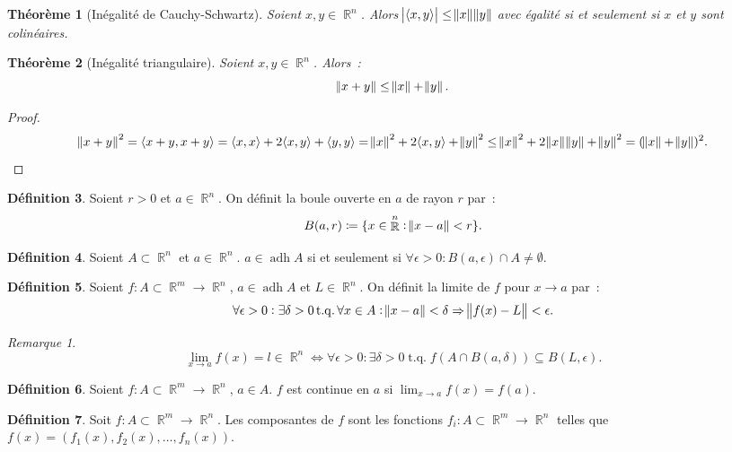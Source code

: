 \documentclass{article}
\DeclareMathOperator{\R}{\mathbb R}
\DeclareMathOperator{\adh}{adh}
\DeclareMathOperator{\tq}{ t.q. }
\newcommand{\scpr}[2]{{\left\langle#1, #2\right\rangle}}
\newtheorem{thm}{Théorème}[section]
\theoremstyle{definition}
\newtheorem{déf}[thm]{Définition}
\theoremstyle{remark}
\newtheorem*{rmq}{Remarque}
\begin{document}
		\begin{thm}[Inégalité de Cauchy-Schwartz] Soient $x, y \in \R^n$. Alors $\abs {\scpr xy} \leq \norm x\norm y$ avec égalité si et seulement si $x$ et
		$y$ sont colinéaires. \end{thm}

		\begin{thm}[Inégalité triangulaire] Soient $x, y \in \R^n$. Alors~:
		\[\norm {x+y} \leq \norm x + \norm y.\]
		\end{thm}

		\begin{proof}
		\[\norm {x+y}^2 = \scpr {x+y}{x+y} = \scpr xx + 2\scpr xy + \scpr yy = \norm x^2 + 2\scpr xy + \norm y^2 \leq \norm x^2 + 2\norm x\norm y + \norm y^2 =
		(\norm x + \norm y)^2.\]
		\end{proof}

		\begin{déf}\label{bouleOuverte} Soient $r > 0$ et $a \in \R^n$. On définit la boule ouverte en $a$ de rayon $r$ par~:
		\[B(a, r) \coloneqq \{x \in \R^n : \norm {x-a} < r\}.\]
		\end{déf}

		\begin{déf} Soient $A \subset \R^n$ et $a \in \R^n$. $a \in \adh A$ si et seulement si $\forall \epsilon > 0 : B(a, \epsilon) \cap A \neq \emptyset$.
		\end{déf}

		\begin{déf} Soient $f : A \subset \R^m \to \R^n$, $a \in \adh A$ et $L \in \R^n$. On définit la limite de $f$ pour $x \to a$ par~:
		\[\forall \epsilon > 0 : \exists \delta > 0 \tq \forall x \in A : \norm {x-a} < \delta \Rightarrow \norm {f(x)-L} < \epsilon.\]
		\end{déf}

		\begin{rmq} \[\lim_{x \to a}f(x) = l \in \R^n \iff \forall \epsilon > 0 : \exists \delta > 0 \tq f(A \cap B(a, \delta)) \subseteq B(L, \epsilon).\]
		\end{rmq}

		\begin{déf} Soient $f : A \subset \R^m \to \R^n$, $a \in A$. $f$ est continue en $a$ si $\lim_{x \to a}f(x) = f(a)$. \end{déf}

		\begin{déf} Soit $f : A \subset \R^m \to \R^n$. Les composantes de $f$ sont les fonctions $f_i : A \subset \R^m \to \R^n$ telles que
		$f(x) = (f_1(x), f_2(x), \ldots, f_n(x))$. \end{déf}
\end{document}
